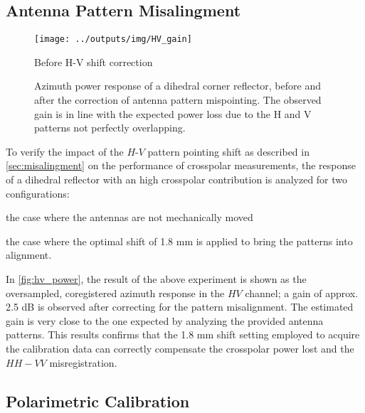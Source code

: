 \subsection{Antenna Pattern Misalingment}
\begin{figure}[ht!]
	\centering
	\texttt{[image: ../outputs/img/HV\_gain]}
	\caption{Before H-V shift correction}
	\label{fig:hv_power:uncalibrated}
	\caption{Azimuth power response of a dihedral corner reflector, before and after the correction of antenna pattern mispointing. The observed gain is in line with the expected power loss due to the H and V patterns not perfectly overlapping.}
	\label{fig:hv_power}
\end{figure}
To verify the impact of the $H$-$V$ pattern pointing shift as described in \autoref{sec:misalingment} on the performance of crosspolar measurements, the response of a dihedral reflector with an high crosspolar contribution is analyzed for two configurations:\\ \begin{enumerate*}\item the case where the antennas are not mechanically moved \item the case where the optimal shift of 1.8 mm is applied to bring the patterns into alignment.\\ 
\end{enumerate*}
In \autoref{fig:hv_power}, the result of the above experiment is shown as the oversampled, coregistered azimuth response in the $HV$ channel; a gain of approx. 2.5 dB is observed after correcting for the pattern misalignment. The estimated gain is very close to the one expected by analyzing the provided antenna patterns. This results confirms that the 1.8 mm shift setting employed to acquire the calibration data can correctly compensate the crosspolar power lost and the $HH-VV$ misregistration.

\subsection{Polarimetric Calibration}\label{sec:res_polcal}

